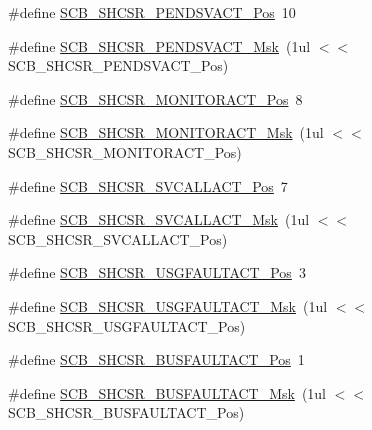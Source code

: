 \begin{DoxyCompactItemize}
\#define \mbox{\hyperlink{group___c_m_s_i_s___c_m3___s_c_b_ga9b9fa69ce4c5ce7fe0861dbccfb15939}{S\+C\+B\+\_\+\+S\+H\+C\+S\+R\+\_\+\+P\+E\+N\+D\+S\+V\+A\+C\+T\+\_\+\+Pos}}~10
\item 
\#define \mbox{\hyperlink{group___c_m_s_i_s___c_m3___s_c_b_gae0e837241a515d4cbadaaae1faa8e039}{S\+C\+B\+\_\+\+S\+H\+C\+S\+R\+\_\+\+P\+E\+N\+D\+S\+V\+A\+C\+T\+\_\+\+Msk}}~(1ul $<$$<$ S\+C\+B\+\_\+\+S\+H\+C\+S\+R\+\_\+\+P\+E\+N\+D\+S\+V\+A\+C\+T\+\_\+\+Pos)
\item 
\#define \mbox{\hyperlink{group___c_m_s_i_s___c_m3___s_c_b_ga8b71cf4c61803752a41c96deb00d26af}{S\+C\+B\+\_\+\+S\+H\+C\+S\+R\+\_\+\+M\+O\+N\+I\+T\+O\+R\+A\+C\+T\+\_\+\+Pos}}~8
\item 
\#define \mbox{\hyperlink{group___c_m_s_i_s___c_m3___s_c_b_gaad09b4bc36e9bccccc2e110d20b16e1a}{S\+C\+B\+\_\+\+S\+H\+C\+S\+R\+\_\+\+M\+O\+N\+I\+T\+O\+R\+A\+C\+T\+\_\+\+Msk}}~(1ul $<$$<$ S\+C\+B\+\_\+\+S\+H\+C\+S\+R\+\_\+\+M\+O\+N\+I\+T\+O\+R\+A\+C\+T\+\_\+\+Pos)
\item 
\#define \mbox{\hyperlink{group___c_m_s_i_s___c_m3___s_c_b_ga977f5176be2bc8b123873861b38bc02f}{S\+C\+B\+\_\+\+S\+H\+C\+S\+R\+\_\+\+S\+V\+C\+A\+L\+L\+A\+C\+T\+\_\+\+Pos}}~7
\item 
\#define \mbox{\hyperlink{group___c_m_s_i_s___c_m3___s_c_b_ga634c0f69a233475289023ae5cb158fdf}{S\+C\+B\+\_\+\+S\+H\+C\+S\+R\+\_\+\+S\+V\+C\+A\+L\+L\+A\+C\+T\+\_\+\+Msk}}~(1ul $<$$<$ S\+C\+B\+\_\+\+S\+H\+C\+S\+R\+\_\+\+S\+V\+C\+A\+L\+L\+A\+C\+T\+\_\+\+Pos)
\item 
\#define \mbox{\hyperlink{group___c_m_s_i_s___c_m3___s_c_b_gae06f54f5081f01ed3f6824e451ad3656}{S\+C\+B\+\_\+\+S\+H\+C\+S\+R\+\_\+\+U\+S\+G\+F\+A\+U\+L\+T\+A\+C\+T\+\_\+\+Pos}}~3
\item 
\#define \mbox{\hyperlink{group___c_m_s_i_s___c_m3___s_c_b_gab3166103b5a5f7931d0df90949c47dfe}{S\+C\+B\+\_\+\+S\+H\+C\+S\+R\+\_\+\+U\+S\+G\+F\+A\+U\+L\+T\+A\+C\+T\+\_\+\+Msk}}~(1ul $<$$<$ S\+C\+B\+\_\+\+S\+H\+C\+S\+R\+\_\+\+U\+S\+G\+F\+A\+U\+L\+T\+A\+C\+T\+\_\+\+Pos)
\item 
\#define \mbox{\hyperlink{group___c_m_s_i_s___c_m3___s_c_b_gaf272760f2df9ecdd8a5fbbd65c0b767a}{S\+C\+B\+\_\+\+S\+H\+C\+S\+R\+\_\+\+B\+U\+S\+F\+A\+U\+L\+T\+A\+C\+T\+\_\+\+Pos}}~1
\item 
\#define \mbox{\hyperlink{group___c_m_s_i_s___c_m3___s_c_b_ga9d7a8b1054b655ad08d85c3c535d4f73}{S\+C\+B\+\_\+\+S\+H\+C\+S\+R\+\_\+\+B\+U\+S\+F\+A\+U\+L\+T\+A\+C\+T\+\_\+\+Msk}}~(1ul $<$$<$ S\+C\+B\+\_\+\+S\+H\+C\+S\+R\+\_\+\+B\+U\+S\+F\+A\+U\+L\+T\+A\+C\+T\+\_\+\+Pos)
$$
\end{DoxyCompactItemize}

